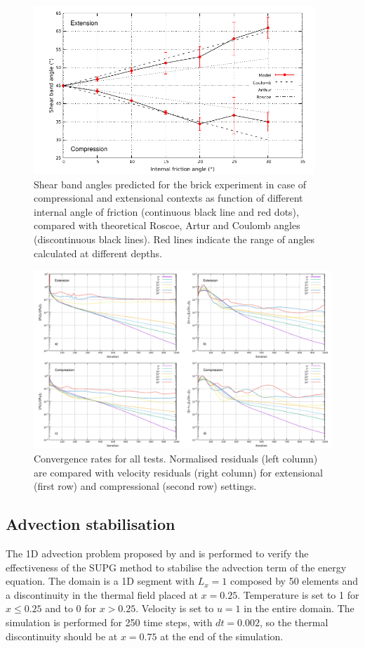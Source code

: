 \documentclass[hidelinks,10pt,a4paper]{article}
\begin{document}
\begin{figure}
\centering
\noindent\includegraphics[width=400px]{./Figures/Brick.pdf}
\caption{Shear band angles predicted for the brick experiment in case of compressional and extensional contexts as function of different internal angle of
friction (continuous black line and red dots), compared with theoretical Roscoe, Artur and Coulomb angles (discontinuous black lines). Red lines indicate the
range of angles calculated at different depths.}
\label{fig:brick}
\end{figure}

\begin{figure}
  \centering
  \noindent\includegraphics[width=500px]{./Figures/convergence.pdf}
  \caption{Convergence rates for all tests. Normalised residuals (left column) are compared with velocity residuals (right column) for extensional (first row)
  and compressional (second row) settings.}
  \label{fig:convergence}
  \end{figure}

\subsection{Advection stabilisation}\label{sec:advection}
The 1D advection problem proposed by \citet{Donea2003} and \citet{Thieulot2011} is performed to verify the effectiveness of the SUPG method to stabilise the
advection term of the energy equation. The domain is a 1D segment with $L_x=1$ composed by 50 elements and a discontinuity in the thermal field placed at
$x=0.25$. Temperature is set to 1 for $x \leq 0.25$ and to 0 for $x > 0.25$. Velocity is set to ${u}=1$ in the entire domain. The simulation is performed for
250 time steps, with $dt=0.002$, so the thermal discontinuity should be at $x=0.75$ at the end of the simulation.
\end{document}
